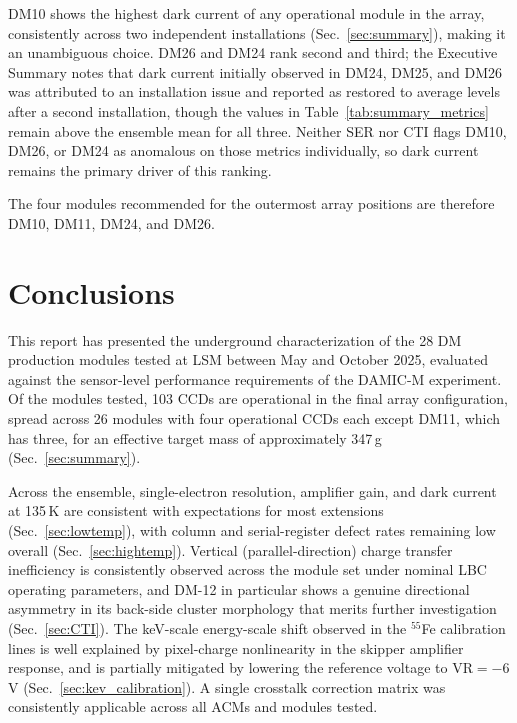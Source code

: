 \documentclass[11pt]{article}
\begin{document}
DM10 shows the highest dark current of any operational module in the array, consistently across two independent installations (Sec.~\ref{sec:summary}), making it an unambiguous choice. DM26 and DM24 rank second and third; the Executive Summary notes that dark current initially observed in DM24, DM25, and DM26 was attributed to an installation issue and reported as restored to average levels after a second installation, though the values in Table~\ref{tab:summary_metrics} remain above the ensemble mean for all three. Neither SER nor CTI flags DM10, DM26, or DM24 as anomalous on those metrics individually, so dark current remains the primary driver of this ranking.

The four modules recommended for the outermost array positions are therefore DM10, DM11, DM24, and DM26.

\FloatBarrier

\newpage
\section{Conclusions}
\label{sec:conclusions}

This report has presented the underground characterization of the 28 DM production modules tested at LSM between May and October 2025, evaluated against the sensor-level performance requirements of the DAMIC-M experiment. Of the modules tested, 103 CCDs are operational in the final array configuration, spread across 26 modules with four operational CCDs each except DM11, which has three, for an effective target mass of approximately 347\,g (Sec.~\ref{sec:summary}).

Across the ensemble, single-electron resolution, amplifier gain, and dark current at 135\,K are consistent with expectations for most extensions (Sec.~\ref{sec:lowtemp}), with column and serial-register defect rates remaining low overall (Sec.~\ref{sec:hightemp}). Vertical (parallel-direction) charge transfer inefficiency is consistently observed across the module set under nominal LBC operating parameters, and DM-12 in particular shows a genuine directional asymmetry in its back-side cluster morphology that merits further investigation (Sec.~\ref{sec:CTI}). The keV-scale energy-scale shift observed in the $^{55}$Fe calibration lines is well explained by pixel-charge nonlinearity in the skipper amplifier response, and is partially mitigated by lowering the reference voltage to $\mathrm{VR}=-6$\,V (Sec.~\ref{sec:kev_calibration}). A single crosstalk correction matrix was consistently applicable across all ACMs and modules tested.
\end{document}
